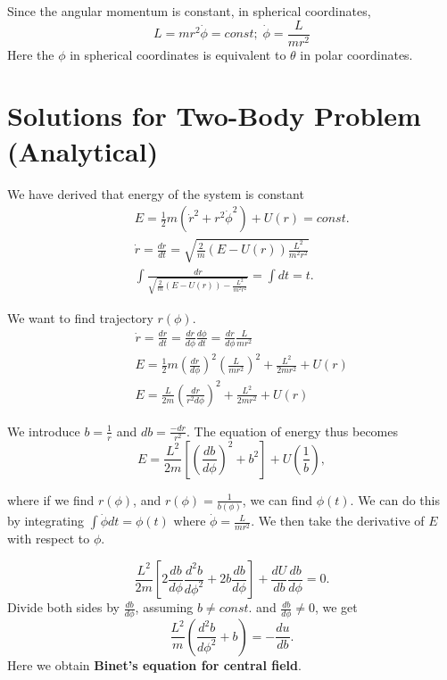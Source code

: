 \documentclass{article}
\begin{document}
Since the angular momentum is constant, in spherical coordinates, 
\begin{equation}
    L = mr^2\dot{\phi} = const; \; \dot{\phi} = \frac{L}{mr^2}
\end{equation}
Here the $\phi$ in spherical coordinates is equivalent to $\theta$ in polar coordinates. 

\section{Solutions for Two-Body Problem (Analytical)}

We have derived that energy of the system is constant
\begin{eqnarray}
    && E = \frac{1}{2}m (\dot{r}^2 + r^2 \dot{\phi}^2) + U(r) = const. \nonumber \\
    && \dot{r} = \frac{dr}{dt} = \sqrt{\frac{2}{m} (E - U(r))\frac{L^2}{m^2 r^2}} \nonumber \\
    && \int \frac{dr}{\sqrt{\frac{2}{m}(E - U(r)) - \frac{L^2}{m^2r^2}}} = \int dt = t .\nonumber
\end{eqnarray}


We want to find trajectory $r(\phi)$.
\begin{eqnarray} \label{eqn:E}
    && \dot{r} = \frac{dr}{dt} = \frac{dr}{d\phi}\frac{d\phi}{dt} = \frac{dr}{d\phi}\frac{L}{mr^2} \nonumber \\
    && E = \frac{1}{2} m \left( \frac{dr}{d\phi}\right)^2 \left( \frac{L}{mr^2}\right)^2 + \frac{L^2}{2mr^2} + U(r) \nonumber \\
    && E = \frac{L}{2m} \left(\frac{dr}{r^2 d\phi}\right)^2 + \frac{L^2}{2mr^2} + U(r) 
\end{eqnarray}

We introduce $b = \frac{1}{r}$ and $db = \frac{-dr}{r^2}$. The equation of energy thus becomes
\begin{equation}
    E = \frac{L^2}{2m} \left[\left(\frac{db}{d\phi}\right)^2 + b^2\right] + U(\frac{1}{b}),
\end{equation}

where if we find $r(\phi)$, and $r(\phi) = \frac{1}{b(\phi)}$, we can find $\phi (t)$. 
We can do this by integrating $\int \dot{\phi} dt = \phi (t)$ where $\dot{\phi} = \frac{L}{mr^2}$.
We then take the derivative of $E$ with respect to $\phi$.

\begin{equation}
    \frac{L^2}{2m} \left[2 \frac{db}{d\phi} \frac{d^2b}{d\phi^2} + 2b \frac{db}{d\phi}\right] + \frac{dU}{db} \frac{db}{d\phi} = 0.
\end{equation}
Divide both sides by $\frac{db}{d\phi}$, assuming $b\neq const.$ and $\frac{db}{d\phi} \neq 0$, we get
\begin{equation}
    \frac{L^2}{m} \left(\frac{d^2b}{d\phi^2} + b\right) = -\frac{du}{db}.
\end{equation}
 Here we obtain \textbf{Binet's equation for central field}.
\end{document}
